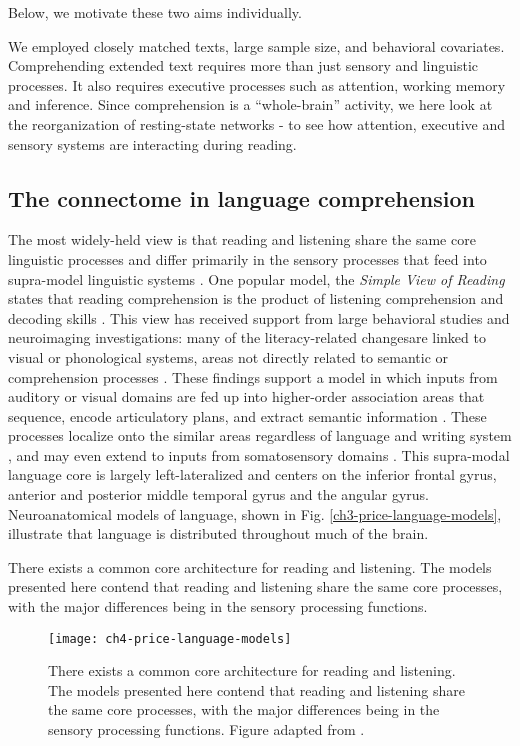 Below, we motivate these two aims individually.

We employed closely matched texts, large sample size, and behavioral covariates. Comprehending extended text requires more than just sensory and linguistic processes. It also requires executive processes such as attention, working memory and inference. Since comprehension is a ``whole-brain'' activity, we here look at the reorganization of resting-state networks - to see how attention, executive and sensory systems are interacting during reading.


\subsection{The connectome in language comprehension}

The most widely-held view is that reading and listening share the same core linguistic processes and differ primarily in the sensory processes that feed into supra-model linguistic systems \citep{Mattingly1971, Price2012}. One popular model, the \textit{Simple View of Reading} states that reading comprehension is the product of listening comprehension and decoding skills \citep{Gough1986}. This view has received support from large behavioral studies \citep{Kirby2008} and neuroimaging investigations: many of the literacy-related changesare linked to visual or phonological systems, areas not directly related to semantic or comprehension processes \citep{Schlaggar2007, Dehaene2015}. These findings support a model in which inputs from auditory or visual domains are fed up into higher-order association areas that sequence, encode articulatory plans, and extract semantic information \citep{Price2012}. These processes localize onto the similar areas regardless of language and writing system \citep{Rueckl2016}, and may even extend to inputs from somatosensory domains \citep{Xu2005, Sood2016}. This supra-modal language core is largely left-lateralized and centers on the inferior frontal gyrus, anterior and posterior middle temporal gyrus and the angular gyrus. Neuroanatomical models of language, shown in Fig. \ref{ch3-price-language-models}, illustrate that language is distributed throughout much of the brain. 

There exists a common core architecture for reading and listening. The models presented here contend that reading and listening share the same core processes, with the major differences being in the sensory processing functions.

\begin{figure}[t]
	\centering
	\texttt{[image: ch4-price-language-models]}
    \caption[Common core architecture for reading and listening.]{There exists a common core architecture for reading and listening. The models presented here contend that reading and listening share the same core processes, with the major differences being in the sensory processing functions. Figure adapted from \citep{Price2012}.}
	\label{fig:ch4-price-language-models}
\end{figure}

